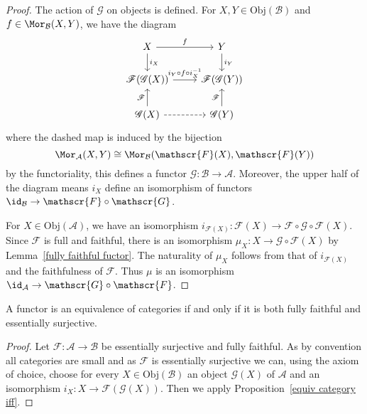 \begin{proof}
The action of $\mathscr{G}$ on objects is defined. For $X,Y\in\mathrm{Obj}(\mathcal{B})$ and $f\in\Mor_{\mathcal{B}}(X,Y)$, we have the diagram
\[\begin{tikzcd}
X\ar[r,"f"]\ar[d,"i_X"]&Y\ar[d,"i_Y"]\\
\mathscr{F}(\mathscr{G}(X))\ar[r,"i_Y\circ f\circ i_X^{-1}"]&\mathscr{F}(\mathscr{G}(Y))\\
\mathscr{G}(X)\ar[r,dashed]\ar[u,"\mathscr{F}"]&\mathscr{G}(Y)\ar[u,"\mathscr{F}"]
\end{tikzcd}\]
where the dashed map is induced by the bijection
\[\Mor_{\mathcal{A}}(X,Y)\cong\Mor_{\mathcal{B}}(\mathscr{F}(X),\mathscr{F}(Y))\]
by the functoriality, this defines a functor $\mathscr{G}:\mathcal{B}\to\mathcal{A}$. Moreover, the upper half of the diagram means $i_X$ define an isomorphism of functors $\id_{\mathcal{B}}\to\mathscr{F}\circ\mathscr{G}$.\par
For $X\in\mathrm{Obj}(\mathcal{A})$, we have an isomorphism $i_{\mathscr{F}(X)}:\mathscr{F}(X)\to\mathscr{F}\circ\mathscr{G}\circ\mathscr{F}(X)$. Since $\mathscr{F}$ is full and faithful, there is an isomorphism $\mu_{X}:X\to\mathscr{G}\circ\mathscr{F}(X)$ by Lemma~\ref{fully faithful fuctor}. The naturality of $\mu_X$ follows from that of $i_{\mathscr{F}(X)}$ and the faithfulness of $\mathscr{F}$. Thus $\mu$ is an isomorphism $\id_{\mathcal{A}}\to\mathscr{G}\circ\mathscr{F}$.
\end{proof}
\begin{corollary}
A functor is an equivalence of categories if and only if it is both fully faithful and essentially surjective.
\end{corollary}
\begin{proof}
Let $\mathscr{F}:\mathcal{A}\to\mathcal{B}$ be essentially surjective and fully faithful. As by convention all categories are small and as $\mathscr{F}$ is essentially surjective we can, using the axiom of choice, choose for every $X\in\mathrm{Obj}(\mathcal{B})$ an object $\mathscr{G}(X)$ of $\mathcal{A}$ and an isomorphism $i_X:X\to\mathscr{F}(\mathscr{G}(X))$. Then we apply Proposition~\ref{equiv category iff}.
\end{proof}
